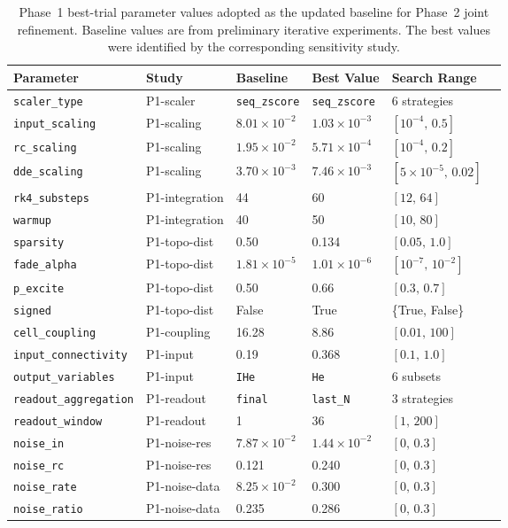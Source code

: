 \documentclass[journal=asbcd6,manuscript=suppinfo]{achemso}
\begin{document}
\begin{table}[H]
    \centering
    \caption{Phase~1 best-trial parameter values adopted as the updated baseline for Phase~2 joint refinement. 
    Baseline values are from preliminary iterative experiments. The best values were identified by the corresponding sensitivity study.}
    \label{tab:phase1-best}
    \small
    \begin{tabular}{llllll}
        \toprule
        Parameter & Study & Baseline & Best Value & Search Range \\
        \midrule
        \texttt{scaler\_type} & P1-scaler & \texttt{seq\_zscore} & \texttt{seq\_zscore} & 6 strategies \\
        \texttt{input\_scaling} & P1-scaling & $8.01 \times 10^{-2}$ & $1.03 \times 10^{-3}$ & $[10^{-4},\, 0.5]$ \\
        \texttt{rc\_scaling} & P1-scaling & $1.95 \times 10^{-2}$ & $5.71 \times 10^{-4}$ & $[10^{-4},\, 0.2]$ \\
        \texttt{dde\_scaling} & P1-scaling & $3.70 \times 10^{-3}$ & $7.46 \times 10^{-3}$ & $[5 \times 10^{-5},\, 0.02]$ \\
        \texttt{rk4\_substeps} & P1-integration & 44 & 60 & $[12,\, 64]$ \\
        \texttt{warmup} & P1-integration & 40 & 50 & $[10,\, 80]$ \\
        \texttt{sparsity} & P1-topo-dist & 0.50 & 0.134 & $[0.05,\, 1.0]$ \\
        \texttt{fade\_alpha} & P1-topo-dist & $1.81 \times 10^{-5}$ & $1.01 \times 10^{-6}$ & $[10^{-7},\, 10^{-2}]$ \\
        \texttt{p\_excite} & P1-topo-dist & 0.50 & 0.66 & $[0.3,\, 0.7]$ \\
        \texttt{signed} & P1-topo-dist & False & True & \{True, False\} \\
        \texttt{cell\_coupling} & P1-coupling & 16.28 & 8.86 & $[0.01,\, 100]$ \\
        \texttt{input\_connectivity} & P1-input & 0.19 & 0.368 & $[0.1,\, 1.0]$ \\
        \texttt{output\_variables} & P1-input & \texttt{IHe} & \texttt{He} & 6 subsets \\
        \texttt{readout\_aggregation} & P1-readout & \texttt{final} & \texttt{last\_N} & 3 strategies \\
        \texttt{readout\_window} & P1-readout & 1 & 36 & $[1,\, 200]$ \\
        \texttt{noise\_in} & P1-noise-res & $7.87 \times 10^{-2}$ & $1.44 \times 10^{-2}$ & $[0,\, 0.3]$ \\
        \texttt{noise\_rc} & P1-noise-res & 0.121 & 0.240 & $[0,\, 0.3]$ \\
        \texttt{noise\_rate} & P1-noise-data & $8.25 \times 10^{-2}$ & 0.300 & $[0,\, 0.3]$ \\
        \texttt{noise\_ratio} & P1-noise-data & 0.235 & 0.286 & $[0,\, 0.3]$ \\
        \bottomrule
    \end{tabular}
\end{table}
\end{document}
